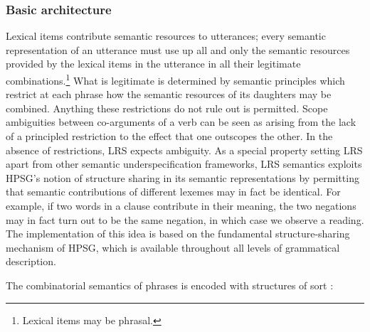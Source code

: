 \documentclass[output=paper,biblatex,babelshorthands,newtxmath,draftmode,colorlinks,citecolor=brown]{langscibook}
\begin{document}
\subsubsection{Basic architecture}
\label{semantics:sec-basic-architecture}

Lexical items contribute semantic resources to utterances; every semantic representation of an utterance must use up all and only the semantic resources provided by the lexical items in the utterance in all their legitimate combinations.\footnote{Lexical items may be phrasal.} What is legitimate is determined by semantic principles which restrict at each phrase how the semantic resources of its daughters may be combined. Anything these restrictions do not rule out is permitted. Scope ambiguities between co-arguments of a verb can be seen as arising from the lack of a principled restriction to the effect that one outscopes the other. In the absence of restrictions, LRS expects ambiguity. As a special property setting LRS apart from other semantic underspecification frameworks, LRS semantics exploits HPSG's notion of structure sharing in its semantic representations by permitting that semantic contributions of different lexemes may in fact be identical. For example, if two words in a clause contribute  in their meaning, the two negations may in fact turn out to be the same negation, in which case we observe a  reading. The implementation of this idea is based on the fundamental structure-sharing mechanism of HPSG, which is available throughout all levels of grammatical description.

The combinatorial semantics of phrases is encoded with structures of sort :


\begin{exe}
  \ex\label{lrs-str}
\end{exe}
\end{document}
